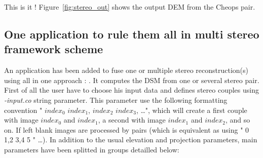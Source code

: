 This is it ! Figure~\ref{fig:stereo_out} shows the output DEM from the Cheops pair.

\subsection{One application to rule them all in multi stereo framework scheme}
An application has been added to fuse one or multiple stereo
reconstruction(s) using all in one approach :
. It computes the DSM 
from one or several stereo pair. First of all the user have to choose his input
data and defines stereo couples using \textit{-input.co} string parameter. This
parameter use the following formatting convention " $index_{0}$  $index_{1}$, 
$index_{2}$ $index_{3}$, \ldots ", which will create a first couple with image
$index_{0}$ and $index_{1}$, a second with image $index_{1}$ and
$index_{2}$, and so on. If left blank images are processed by pairs (which is
equivalent as using " 0 1,2 3,4 5 " \ldots). 
In addition to the usual elevation and projection parameters,
main parameters have been splitted in groups detailled below:
